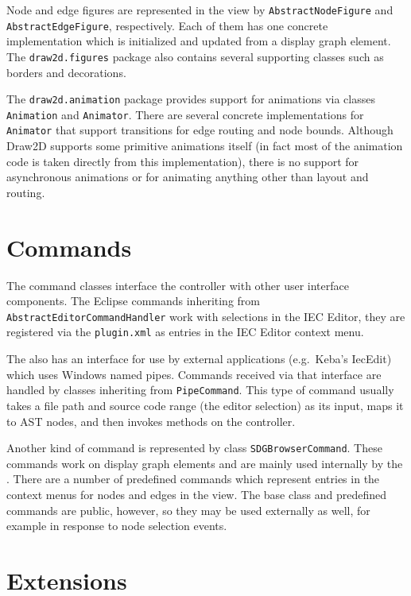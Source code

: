 Node and edge figures are represented in the view by \lstinline|AbstractNodeFigure| and \lstinline|AbstractEdgeFigure|, 
respectively. Each of them has one concrete implementation which is initialized and updated from a display graph 
element. The \lstinline|draw2d.figures| package also contains several supporting classes such as borders and 
decorations.

The \lstinline|draw2d.animation| package provides support for animations via classes \lstinline|Animation| and 
\lstinline|Animator|. There are several concrete implementations for \lstinline|Animator| that support transitions for 
edge routing and node bounds. Although Draw2D supports some primitive animations itself (in fact most of the animation 
code is taken directly from this implementation), there is no support for asynchronous animations or for animating 
anything other than layout and routing.


\section{Commands}

The command classes interface the \SB controller with other user interface components. The Eclipse commands inheriting 
from \lstinline|AbstractEditorCommandHandler| work with selections in the IEC Editor, they are registered via the \SB 
\lstinline|plugin.xml| as entries in the IEC Editor context menu.

The \SB also has an interface for use by external applications (e.g.\ Keba's IecEdit) which uses Windows named pipes. 
Commands received via that interface are handled by classes inheriting from \lstinline|PipeCommand|. This type of 
command usually takes a file path and source code range (the editor selection) as its input, maps it to AST nodes, and 
then invokes methods on the \SB controller.

Another kind of command is represented by class \lstinline|SDGBrowserCommand|. These commands work on display graph 
elements and are mainly used internally by the \SB. There are a number of predefined commands which represent entries 
in the context menus for nodes and edges in the \SB view. The base class and predefined commands are public, however, 
so they may be used externally as well, for example in response to node selection events.


\section{Extensions}

